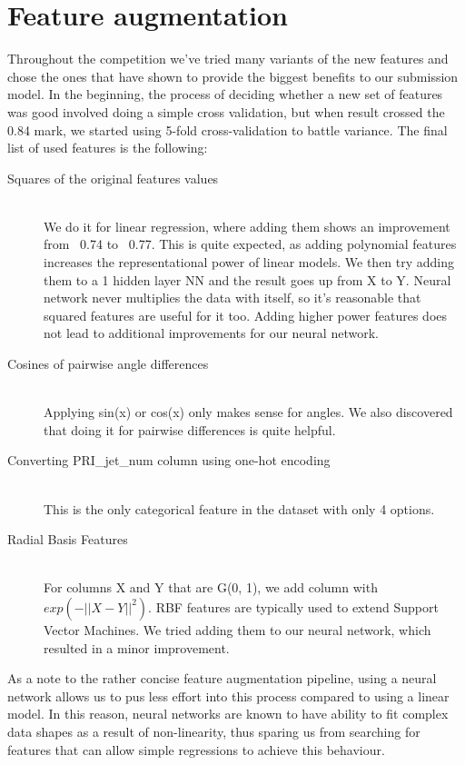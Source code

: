 \documentclass[10pt,conference,compsocconf]{IEEEtran}
\begin{document}
\section{Feature augmentation}
Throughout the competition we've tried many variants of the new features and chose the ones that have shown to provide the biggest benefits to our submission model. In the beginning, the process of deciding whether a new set of features was good involved doing a simple cross validation, but when result crossed the 0.84 mark, we started using 5-fold cross-validation to battle variance. The final list of used features is the following:
\begin{description}
\item[Squares of the original features values] \ \\
	We do it for linear regression, where adding them shows an improvement from ~0.74 to ~0.77. This is quite expected, as adding polynomial features increases the representational power of linear models. We then try adding them to a 1 hidden layer NN and the result goes up from X to Y. Neural network never multiplies the data with itself, so it's reasonable that squared features are useful for it too. Adding higher power features does not lead to additional improvements for our neural network.
	
\item[Cosines of pairwise angle differences] \ \\
	Applying sin(x) or cos(x) only makes sense for angles. We also discovered that doing it for pairwise differences is quite helpful.
	
\item[Converting PRI\_jet\_num column using one-hot encoding] \ \\
	This is the only categorical feature in the dataset with only 4 options.
	
\item[Radial Basis Features] \ \\
	For columns X and Y that are G(0, 1), we add column with $exp(-||X-Y||^2)$. 
	RBF features are typically used to extend Support Vector Machines. We tried adding them to our neural network, which resulted in a minor improvement.
\end{description}

As a note to the rather concise feature augmentation pipeline, using a neural network allows us to pus less effort into this process compared to using a linear model. In this reason, neural networks are known to have ability to fit complex data shapes as a result of non-linearity, thus sparing us from searching for features that can allow simple regressions to achieve this behaviour.





\end{document}

